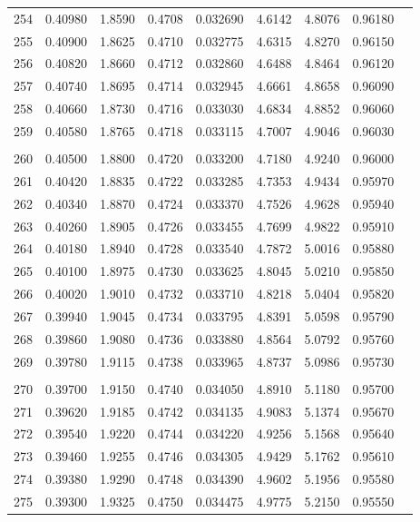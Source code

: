 \documentclass[letter,twosides,10pt]{article}
\begin{document}
\begin{longtable}{|c|c|c|c|c|c|c|c|c|}
254 & 0.40980 & 1.8590 & 0.4708 & 0.032690 & 4.6142 &  4.8076 & 0.96180 \\
255 & 0.40900 & 1.8625 & 0.4710 & 0.032775 & 4.6315 &  4.8270 & 0.96150 \\
256 & 0.40820 & 1.8660 & 0.4712 & 0.032860 & 4.6488 &  4.8464 & 0.96120 \\
257 & 0.40740 & 1.8695 & 0.4714 & 0.032945 & 4.6661 &  4.8658 & 0.96090 \\
258 & 0.40660 & 1.8730 & 0.4716 & 0.033030 & 4.6834 &  4.8852 & 0.96060 \\
259 & 0.40580 & 1.8765 & 0.4718 & 0.033115 & 4.7007 &  4.9046 & 0.96030 \\
 & & & & & & & \\
260 & 0.40500 & 1.8800 & 0.4720 & 0.033200 & 4.7180 &  4.9240 & 0.96000 \\
261 & 0.40420 & 1.8835 & 0.4722 & 0.033285 & 4.7353 &  4.9434 & 0.95970 \\
262 & 0.40340 & 1.8870 & 0.4724 & 0.033370 & 4.7526 &  4.9628 & 0.95940 \\
263 & 0.40260 & 1.8905 & 0.4726 & 0.033455 & 4.7699 &  4.9822 & 0.95910 \\
264 & 0.40180 & 1.8940 & 0.4728 & 0.033540 & 4.7872 &  5.0016 & 0.95880 \\
265 & 0.40100 & 1.8975 & 0.4730 & 0.033625 & 4.8045 &  5.0210 & 0.95850 \\
266 & 0.40020 & 1.9010 & 0.4732 & 0.033710 & 4.8218 &  5.0404 & 0.95820 \\
267 & 0.39940 & 1.9045 & 0.4734 & 0.033795 & 4.8391 &  5.0598 & 0.95790 \\
268 & 0.39860 & 1.9080 & 0.4736 & 0.033880 & 4.8564 &  5.0792 & 0.95760 \\
269 & 0.39780 & 1.9115 & 0.4738 & 0.033965 & 4.8737 &  5.0986 & 0.95730 \\
 & & & & & & & \\
270 & 0.39700 & 1.9150 & 0.4740 & 0.034050 & 4.8910 &  5.1180 & 0.95700 \\
271 & 0.39620 & 1.9185 & 0.4742 & 0.034135 & 4.9083 &  5.1374 & 0.95670 \\
272 & 0.39540 & 1.9220 & 0.4744 & 0.034220 & 4.9256 &  5.1568 & 0.95640 \\
273 & 0.39460 & 1.9255 & 0.4746 & 0.034305 & 4.9429 &  5.1762 & 0.95610 \\
274 & 0.39380 & 1.9290 & 0.4748 & 0.034390 & 4.9602 &  5.1956 & 0.95580 \\
275 & 0.39300 & 1.9325 & 0.4750 & 0.034475 & 4.9775 &  5.2150 & 0.95550 \\

\end{longtable}
\end{document}
